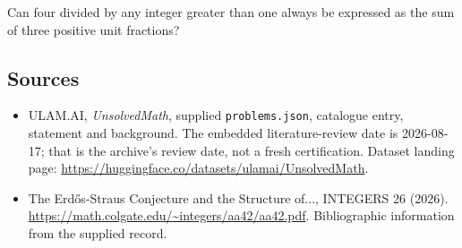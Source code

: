 \documentclass[11pt,a4paper]{article}
\begin{document}
Can four divided by any integer greater than one always be expressed as the sum of three positive unit fractions?

\subsection{Sources}

{\small

\begin{itemize}

\item[\hypertarget{source:statement:1}{S1}] ULAM.AI, \emph{UnsolvedMath}, supplied \texttt{problems.json}, catalogue entry, statement and background. The embedded literature-review date is 2026-08-17; that is the archive’s review date, not a fresh certification. Dataset landing page: \url{https://huggingface.co/datasets/ulamai/UnsolvedMath}.

\item[\hypertarget{source:statement:2}{S2}] The Erdős-Straus Conjecture and the Structure of..., INTEGERS 26 (2026). \url{https://math.colgate.edu/~integers/aa42/aa42.pdf}. Bibliographic information from the supplied record.

\end{itemize}

}

\label{end:statement}
\end{document}
